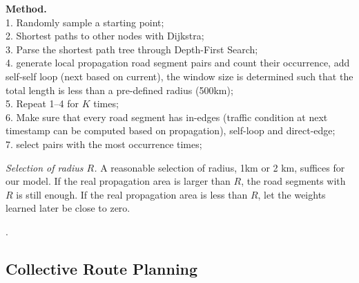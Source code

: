 {\bf Method.} \\
1. Randomly sample a starting point; \\
2. Shortest paths to other nodes with Dijkstra; \\
3. Parse the shortest path tree through Depth-First Search; \\
4. generate local propagation road segment pairs and count their occurrence, add self-self loop (next based on current), the window size is determined such that the total length is less than a pre-defined radius (500km); \\
5. Repeat 1--4 for $K$ times; \\
6. Make sure that every road segment has in-edges (traffic condition at next timestamp can be computed based on propagation), self-loop and direct-edge; \\
7. select pairs with the most occurrence times;

{\em Selection of radius $R$.} A reasonable selection of radius, \eg 1km or 2 km, suffices for our model. If the real propagation area is larger than $R$, the road segments with $R$ is still enough. If the real propagation area is less than $R$, let the weights learned later be close to zero.

.



\subsection{Collective Route Planning}
\label{subsec-route}

